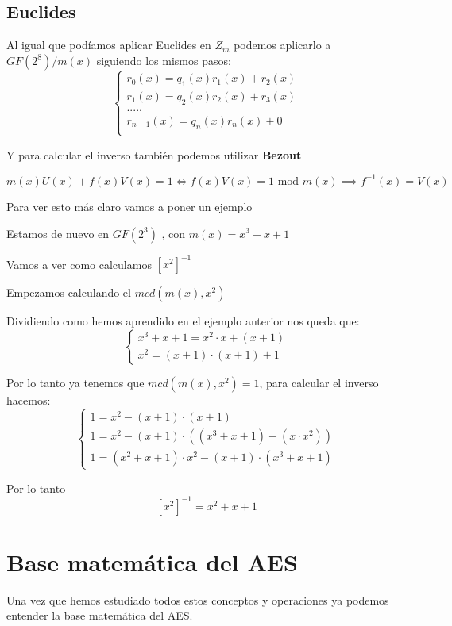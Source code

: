 \subsection{Euclides}
Al igual que podíamos aplicar Euclides en $Z_m$ podemos aplicarlo a $GF(2^8)/m(x)$ siguiendo los mismos pasos:
$$\begin{cases}
	r_0(x) = q_1(x)r_1(x) + r_2(x)\\
	r_1(x) = q_2(x)r_2(x) + r_3(x)\\
	.....\\
	r_{n-1}(x) = q_n(x)r_n(x) + 0\\
\end{cases}$$

Y para calcular el inverso también podemos utilizar \textbf{Bezout}

$$m(x)U(x) + f(x)V(x) = 1 \iff f(x)V(x) = 1 \text{ mod } m(x) \implies f^{-1}(x) = V(x)$$

Para ver esto más claro vamos a poner un ejemplo
\begin{example}
	Estamos de nuevo en $GF(2^3)$ , con $m(x) = x^3 + x +1$
	
	Vamos a ver como calculamos $[x^2]^{-1}$
	
	Empezamos calculando el $mcd(m(x), x^2)$
	
	Dividiendo como hemos aprendido en el ejemplo anterior nos queda que:
	$$\begin{cases}
		x^3 + x + 1 = x^2 \cdot x + (x+1)\\
		x^2 = (x+1)\cdot(x+1) +1
	\end{cases}$$
	
	Por lo tanto ya tenemos que $mcd(m(x), x^2) = 1$, para calcular el inverso hacemos:
	$$\begin{cases}
		 1 = x^2 -(x+1)\cdot(x+1)\\
		 1 = x^2 -(x+1)\cdot((x^3 +x +1) -(x\cdot x^2))\\
		 1 = (x^2 + x + 1)\cdot x^2 -(x+1)\cdot(x^3 + x +1)
	\end{cases}$$
	
	Por lo tanto 
	$$[x^2]^{-1} = x^2 + x + 1$$
	
\end{example}

\section{Base matemática del AES}

Una vez que hemos estudiado todos estos conceptos y operaciones ya podemos entender la base matemática del AES.

